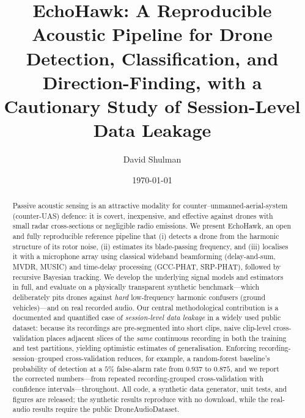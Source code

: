 \documentclass[11pt]{article}
\title{EchoHawk: A Reproducible Acoustic Pipeline for Drone Detection,
Classification, and Direction-Finding, with a Cautionary Study of
Session-Level Data Leakage}
\author{David Shulman}
\affil{\small\texttt{github.com/shulm/echohawk}}
\date{\today}
\begin{document}
\maketitle

\begin{abstract}
Passive acoustic sensing is an attractive modality for counter--unmanned-aerial-system
(counter-UAS) defence: it is covert, inexpensive, and effective against drones
with small radar cross-sections or negligible radio emissions. We present
EchoHawk, an open and fully reproducible reference pipeline that (i) detects a
drone from the harmonic structure of its rotor noise, (ii) estimates its
blade-passing frequency, and (iii) localises it with a microphone array using
classical wideband beamforming (delay-and-sum, MVDR, MUSIC) and time-delay
processing (GCC-PHAT, SRP-PHAT), followed by recursive Bayesian tracking. We
develop the underlying signal models and estimators in full, and evaluate on a
physically transparent synthetic benchmark---which deliberately pits drones
against \emph{hard} low-frequency harmonic confusers (ground vehicles)---and on
real recorded audio. Our central methodological contribution is a documented and
quantified case of \emph{session-level data leakage} in a widely used public
dataset: because its recordings are pre-segmented into short clips, naive
clip-level cross-validation places adjacent slices of the \emph{same} continuous
recording in both the training and test partitions, yielding optimistic
estimates of generalisation. Enforcing recording-session--grouped
cross-validation reduces, for example, a random-forest baseline's probability of
detection at a $5\%$ false-alarm rate from $0.937$ to $0.875$, and we report the
corrected numbers---from repeated recording-grouped cross-validation with
confidence intervals---throughout. All code, a synthetic data generator, unit
tests, and figures are released; the synthetic results reproduce with no download,
while the real-audio results require the public DroneAudioDataset.
\end{abstract}
\end{document}
